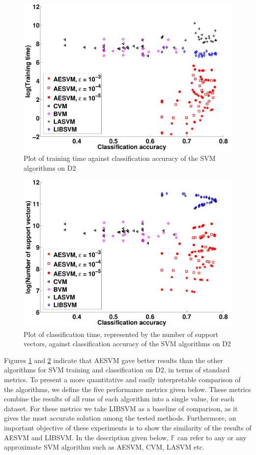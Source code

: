 \documentclass[twoside]{article}
\begin{document}
\begin{figure}[h!]
\centering
\includegraphics[scale = 0.52]{TvsAccpA}
\caption{Plot of training time against classification accuracy of the SVM algorithms on D2}\label{fig:paRes1}
\end{figure}

\begin{figure}[h!]
\centering
\includegraphics[scale = 0.52]{SVvsAccpA}
\caption{Plot of classification time, represented by the number of support vectors, against classification accuracy of the SVM algorithms on D2}\label{fig:paRes2}
\end{figure}

Figures \ref{fig:paRes1} and \ref{fig:paRes2} indicate that AESVM gave better results than the other algorithms for SVM training and classification on D2, in terms of standard metrics. To present a more quantitative and easily interpretable comparison of the algorithms, we define the five performance metrics given below. These metrics combine the results of all runs of each algorithm into a single value, for each dataset. For these metrics we take LIBSVM as a baseline of comparison, as it gives the most accurate solution among the tested methods. Furthermore, an important objective of these experiments is to show the similarity of the results of AESVM and LIBSVM. In the description given below, $\mathbb{F}$ can refer to any or any approximate SVM algorithm such as AESVM, CVM, LASVM etc.
\end{document}
